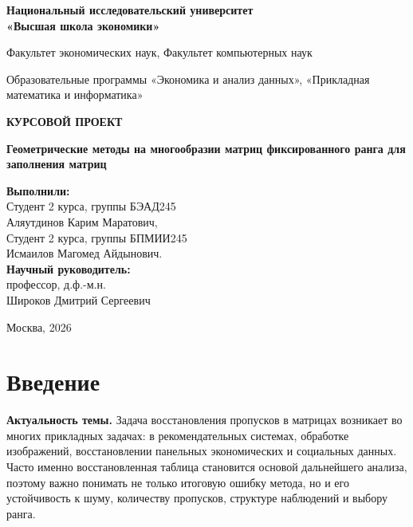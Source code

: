 \documentclass[a4paper,12pt]{article}
\begin{document}
\begin{titlepage}
    \centering
    {\large\bfseries Национальный исследовательский университет\\
    «Высшая школа экономики»\par}
    \vspace{1cm}
    {\large Факультет экономических наук, Факультет компьютерных наук\par}
    {\large Образовательные программы «Экономика и анализ данных», «Прикладная математика и информатика»\par}
    \vspace{2cm}
    {\Large\bfseries КУРСОВОЙ ПРОЕКТ\par}
    \vspace{1cm}
    {\Large\bfseries Геометрические методы на многообразии матриц фиксированного ранга для заполнения матриц\par}
    \vspace{2cm}
    \begin{flushright}
        \large
        \textbf{Выполнили:}\\
        Студент 2 курса, группы БЭАД245\\
        Аляутдинов Карим Маратович,\\
        Студент 2 курса, группы БПМИИ245\\
        Исмаилов Магомед Айдынович.\\
        \vspace{0.5cm}
        \textbf{Научный руководитель:}\\
        профессор, д.ф.-м.н.\\
        Широков Дмитрий Сергеевич\\
    \end{flushright}
    \vfill
    {\large Москва, 2026\par}
\end{titlepage}

\tableofcontents
\newpage

\section*{Введение}
{}

\textbf{Актуальность темы.} Задача восстановления пропусков в матрицах возникает во многих прикладных задачах: в рекомендательных системах, обработке изображений, восстановлении панельных экономических и социальных данных. Часто именно восстановленная таблица становится основой дальнейшего анализа, поэтому важно понимать не только итоговую ошибку метода, но и его устойчивость к шуму, количеству пропусков, структуре наблюдений и выбору ранга.
\end{document}
